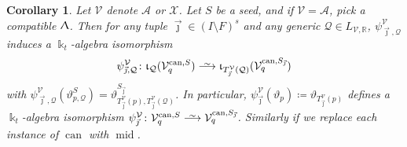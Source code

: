 \documentclass{amsart}
\DeclareMathOperator{\midd}{mid}
\DeclareMathOperator{\can}{can}
\let\bb=\mathbb
\let\s=\mathcal
\def\risom{\buildrel\sim\over{\smashedlongrightarrow}}
\def\smashedlongrightarrow{\setbox0=\hbox{$\longrightarrow$}\ht0=1.25pt\box0}
\newcommand {\kk} {\Bbbk}
\newcommand {\kt} {\kk_t}
\newcommand {\sQ} {\mathcal{Q}}
\newcommand {\jj} {\vec{\jmath}}
\renewcommand{\iota}{\upiota}
\renewcommand{\Lambda}{\Uplambda}
\theoremstyle{plain}%
\newtheorem{cor}[thm]{Corollary}
\theoremstyle{definition}
\theoremstyle{remark}
\begin{document}
\begin{cor}\label{TjCor}
Let $\s{V}$ denote $\s{A}$ or $\s{X}$.  Let $S$ be a seed, and if $\s{V}=\s{A}$, pick a compatible $\Lambda$.  Then for any tuple $\jj\in (I\setminus F)^s$ and any generic $\sQ\in L_{\s{V},\bb{R}}$, $\psi_{\jj,\sQ}^{\s{V}}$ induces a $\kt$-algebra isomorphism
\begin{align*}
    \psi_{\jj,\sQ}^{\s{V}}\colon \iota_{\sQ}(\s{V}_q^{\can,S})\risom \iota_{T_{\jj}^{\s{V}}(\sQ)}(\s{V}_q^{\can,S_{\jj}})
\end{align*}
with $\psi_{\jj,\sQ}^{\s{V}}(\vartheta^S_{p,\sQ})=\vartheta^{S_{\jj}}_{T_{\jj}^{\s{V}}(p),T_{\jj}^{\s{V}}(\sQ)}$.  In particular, $\psi_{\jj}^{\s{V}}(\vartheta_p)\coloneqq \vartheta_{T_{\jj}^{\s{V}}(p)}$ defines a $\kt$-algebra isomorphism $\psi_{\jj}^{\s{V}}\colon \s{V}_q^{\can,S}\risom \s{V}_q^{\can,S_{\jj}}$.  
Similarly if we replace each instance of $\can$ with $\midd$.
\end{cor}
\end{document}
